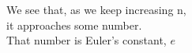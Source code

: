\documentclass[preview]{standalone}
\begin{document}
\begin{center}
We see that, as we keep increasing n, \\ it approaches some number. \\ That number is Euler's constant, $e$
\end{center}
\end{document}
